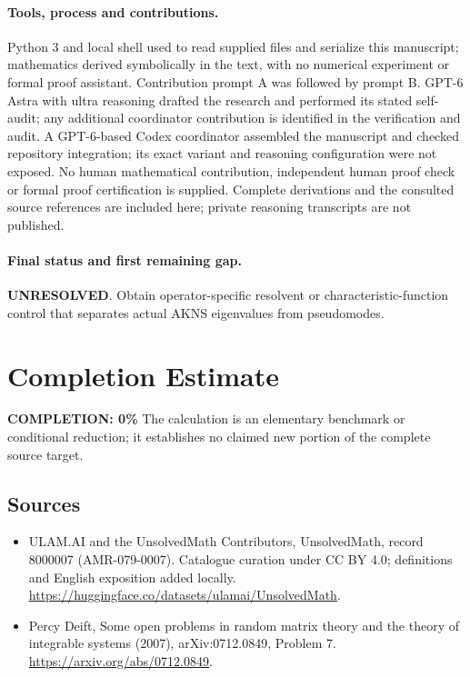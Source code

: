 \documentclass[11pt]{article}
\begin{document}
\paragraph{Tools, process and contributions.}
Python 3 and local shell used to read supplied files and serialize this manuscript; mathematics derived symbolically in the text, with no numerical experiment or formal proof assistant. Contribution prompt A was followed by prompt B. GPT-6 Astra with ultra reasoning drafted the research and performed its stated self-audit; any additional coordinator contribution is identified in the verification and audit. A GPT-6-based Codex coordinator assembled the manuscript and checked repository integration; its exact variant and reasoning configuration were not exposed. No human mathematical contribution, independent human proof check or formal proof certification is supplied. Complete derivations and the consulted source references are included here; private reasoning transcripts are not published.

\paragraph{Final status and first remaining gap.}
\textbf{UNRESOLVED}. Obtain operator-specific resolvent or characteristic-function control that separates actual AKNS eigenvalues from pseudomodes.

\section{Completion Estimate}
\noindent\textbf{COMPLETION: 0\%}
The calculation is an elementary benchmark or conditional reduction; it establishes no claimed new portion of the complete source target.

\subsection{Sources}
\begin{itemize}
\item[\hypertarget{source:8000007:1}{S1}] ULAM.AI and the UnsolvedMath Contributors, UnsolvedMath, record 8000007 (AMR-079-0007). Catalogue curation under CC BY 4.0; definitions and English exposition added locally.
\url{https://huggingface.co/datasets/ulamai/UnsolvedMath}.
\item[\hypertarget{source:8000007:2}{S2}] Percy Deift, Some open problems in random matrix theory and the theory of integrable systems (2007), arXiv:0712.0849, Problem 7.
\url{https://arxiv.org/abs/0712.0849}.
\end{itemize}
\label{end:8000007}
\end{document}
